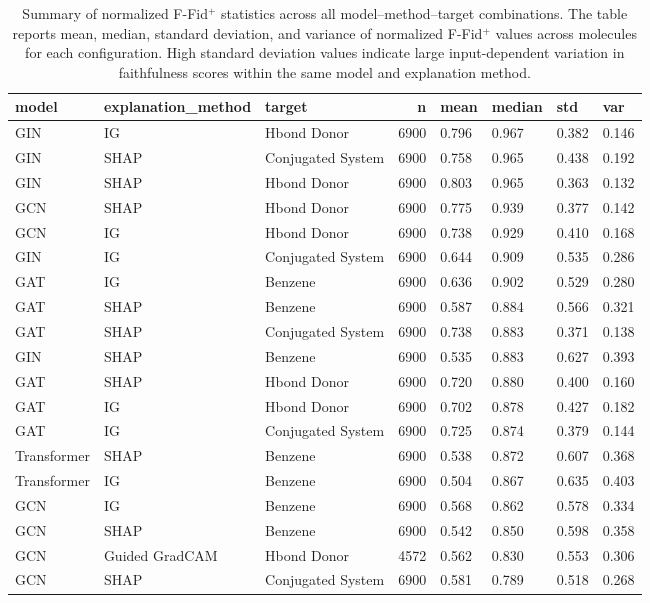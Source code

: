 \begin{table}
\caption{Summary of normalized F-Fid$^+$ statistics across all model--method--target combinations. The table reports mean, median, standard deviation, and variance of normalized F-Fid$^+$ values across molecules for each configuration. High standard deviation values indicate large input-dependent variation in faithfulness scores within the same model and explanation method.}
\label{tab:supp_fid_variation}
\begin{tabular}{lllrllll}
\toprule
model & explanation_method & target & n & mean & median & std & var \\
\midrule
GIN & IG & Hbond Donor & 6900 & 0.796 & 0.967 & 0.382 & 0.146 \\
GIN & SHAP & Conjugated System & 6900 & 0.758 & 0.965 & 0.438 & 0.192 \\
GIN & SHAP & Hbond Donor & 6900 & 0.803 & 0.965 & 0.363 & 0.132 \\
GCN & SHAP & Hbond Donor & 6900 & 0.775 & 0.939 & 0.377 & 0.142 \\
GCN & IG & Hbond Donor & 6900 & 0.738 & 0.929 & 0.410 & 0.168 \\
GIN & IG & Conjugated System & 6900 & 0.644 & 0.909 & 0.535 & 0.286 \\
GAT & IG & Benzene & 6900 & 0.636 & 0.902 & 0.529 & 0.280 \\
GAT & SHAP & Benzene & 6900 & 0.587 & 0.884 & 0.566 & 0.321 \\
GAT & SHAP & Conjugated System & 6900 & 0.738 & 0.883 & 0.371 & 0.138 \\
GIN & SHAP & Benzene & 6900 & 0.535 & 0.883 & 0.627 & 0.393 \\
GAT & SHAP & Hbond Donor & 6900 & 0.720 & 0.880 & 0.400 & 0.160 \\
GAT & IG & Hbond Donor & 6900 & 0.702 & 0.878 & 0.427 & 0.182 \\
GAT & IG & Conjugated System & 6900 & 0.725 & 0.874 & 0.379 & 0.144 \\
Transformer & SHAP & Benzene & 6900 & 0.538 & 0.872 & 0.607 & 0.368 \\
Transformer & IG & Benzene & 6900 & 0.504 & 0.867 & 0.635 & 0.403 \\
GCN & IG & Benzene & 6900 & 0.568 & 0.862 & 0.578 & 0.334 \\
GCN & SHAP & Benzene & 6900 & 0.542 & 0.850 & 0.598 & 0.358 \\
GCN & Guided GradCAM & Hbond Donor & 4572 & 0.562 & 0.830 & 0.553 & 0.306 \\
GCN & SHAP & Conjugated System & 6900 & 0.581 & 0.789 & 0.518 & 0.268 \\

\end{tabular}
\end{table}
